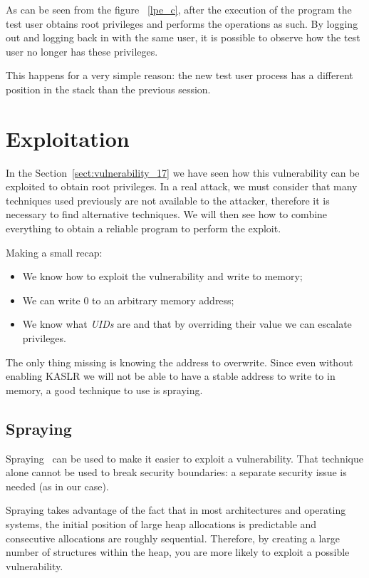 \documentclass{masterthesis}
\newcommand{\refToSection}[1]{Section~\ref{sect:#1}\xspace}
\begin{document}
As can be seen from the figure ~\ref{lpe_c}, after the execution of the program the test user obtains root privileges and performs the operations as such.
By logging out and logging back in with the same user, it is possible to observe how the test user no longer has these privileges.

This happens for a very simple reason: the new test user process has a different position in the stack than the previous session.



\section{Exploitation}
\label{sect:exp-cve}   
 
In the \refToSection{vulnerability_17} we have seen how this vulnerability can be exploited to obtain root privileges. In a real attack, we must consider that many techniques used previously are not available to the attacker, therefore it is necessary to find alternative techniques.
We will then see how to combine everything to obtain a reliable program to perform the exploit.

Making a small recap:
\begin{itemize}
   \item We know how to exploit the vulnerability and write to memory;
   \item We can write 0 to an arbitrary memory address;
   \item We know what \emph{UIDs} are and that by overriding their value we can escalate privileges.
\end {itemize}

The only thing missing is knowing the address to overwrite.
Since even without enabling KASLR we will not be able to have a stable address to write to in memory, a good technique to use is spraying.

\subsection{Spraying}
\label{subsect:spraying}

Spraying~\cite{ratanaworabhan2009nozzle} can be used to make it easier to exploit a vulnerability. That technique alone cannot be used to break security boundaries: a separate security issue is needed (as in our case).

Spraying takes advantage of the fact that in most architectures and operating systems, the initial position of large heap allocations is predictable and consecutive allocations are roughly sequential.
Therefore, by creating a large number of structures within the heap, you are more likely to exploit a possible vulnerability.
\end{document}
